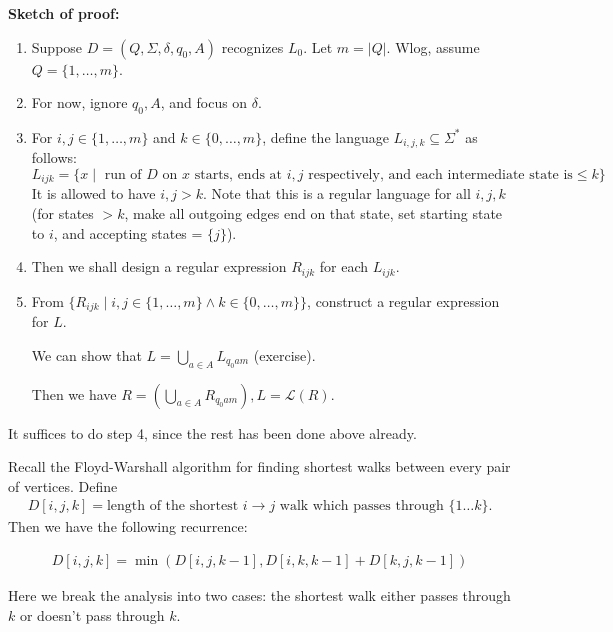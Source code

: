 \documentclass[a4paper]{article}
\newcommand{\mc}{\mathcal}
\renewcommand{\L}{\mc{L}}
\begin{document}
\begin{note}
    \textbf{Sketch of proof:}

    \begin{enumerate}
        \item Suppose $D = (Q, \Sigma, \delta, q_0, A)$ recognizes $L_0$. Let $m = |Q|$. Wlog, assume $Q = \{1, \ldots, m\}$.
        \item For now, ignore $q_0, A$, and focus on $\delta$.
        \item For $i, j \in \{1, \ldots, m\}$ and $k \in \{0, \ldots, m\}$, define the language $L_{i, j, k} \subseteq \Sigma^*$ as follows:
            \[
                L_{ijk} = \{x \mid \text{ run of } D \text{ on } x \text{ starts, ends at } i, j \text{ respectively, and each intermediate state is} \le k \}
            \]
            It is allowed to have $i, j > k$.
            Note that this is a regular language for all $i, j, k$ (for states $> k$, make all outgoing edges end on that state, set starting state to $i$, and accepting states = $\{j\}$).
        \item Then we shall design a regular expression $R_{ijk}$ for each $L_{ijk}$.
        \item 
            From $\{R_{ijk} \mid i, j \in \{1, \ldots, m\} \land k \in \{0, \ldots, m\}\}$, construct a regular expression for $L$.

            We can show that $L = \bigcup_{a \in A} L_{q_0am}$ (exercise).

            Then we have $R = \left(\bigcup_{a \in A} R_{q_0am}\right), L = \L(R)$.

    \end{enumerate}
    It suffices to do step 4, since the rest has been done above already.

    Recall the Floyd-Warshall algorithm for finding shortest walks between every pair of vertices. Define 
    \begin{align*}
        D[i, j, k] = \text{length of the shortest } i \to j \text{ walk which passes through } \{1 \ldots k\}.
    \end{align*}
    Then we have the following recurrence:

    \begin{align*}
        D[i, j, k] = \min(D[i, j, k - 1], D[i, k, k - 1] + D[k, j, k - 1])
    \end{align*}

    Here we break the analysis into two cases: the shortest walk either passes through $k$ or doesn't pass through $k$.


\end{note}
\end{document}
